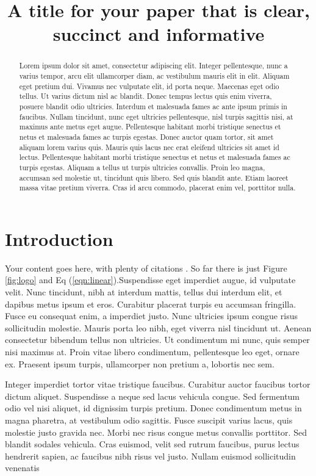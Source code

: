 \documentclass[OGEO,XML,SOM,NoBabelFrench,Unicode,twocolumn,review]{cedram}
\title{A title for your paper that is clear, succinct and informative}
\begin{document}
    \begin{abstract}
        Lorem ipsum dolor sit amet, consectetur adipiscing elit. Integer pellentesque, nunc a varius tempor, arcu elit ullamcorper diam, ac vestibulum mauris elit in elit. Aliquam eget pretium dui. Vivamus nec vulputate elit, id porta neque. Maecenas eget odio tellus. Ut varius dictum nisl ac blandit. Donec tempus lectus quis enim viverra, posuere blandit odio ultricies. Interdum et malesuada fames ac ante ipsum primis in faucibus. Nullam tincidunt, nunc eget ultricies pellentesque, nisl turpis sagittis nisi, at maximus ante metus eget augue. Pellentesque habitant morbi tristique senectus et netus et malesuada fames ac turpis egestas. Donec auctor quam tortor, sit amet aliquam lorem varius quis. Mauris quis lacus nec erat eleifend ultricies sit amet id lectus. Pellentesque habitant morbi tristique senectus et netus et malesuada fames ac turpis egestas. Aliquam a tellus ut turpis ultricies convallis. Proin leo magna, accumsan sed molestie ut, tincidunt quis libero. Sed quis blandit ante. Etiam laoreet massa vitae pretium viverra. Cras id arcu commodo, placerat enim vel, porttitor nulla.
    \end{abstract}
    
    \maketitle

    \section{Introduction}

        Your content goes here, with plenty of citations \citep{sample}. So far there is just Figure \ref{fig:logo} and Eq (\ref{eqn:linear}).Suspendisse eget imperdiet augue, id vulputate velit. Nunc tincidunt, nibh at interdum mattis, tellus dui interdum elit, et dapibus metus ipsum et eros. Curabitur placerat turpis eu accumsan fringilla. Fusce eu consequat enim, a imperdiet justo. Nunc ultricies ipsum congue risus sollicitudin molestie. Mauris porta leo nibh, eget viverra nisl tincidunt ut. Aenean consectetur bibendum tellus non ultricies. Ut condimentum mi nunc, quis semper nisi maximus at. Proin vitae libero condimentum, pellentesque leo eget, ornare ex. Praesent ipsum turpis, ullamcorper non pretium a, lobortis nec sem.

        Integer imperdiet tortor vitae tristique faucibus. Curabitur auctor faucibus tortor dictum aliquet. Suspendisse a neque sed lacus vehicula congue. Sed fermentum odio vel nisi aliquet, id dignissim turpis pretium. Donec condimentum metus in magna pharetra, at vestibulum odio sagittis. Fusce suscipit varius lacus, quis molestie justo gravida nec. Morbi nec risus congue metus convallis porttitor. Sed blandit sodales vehicula. Cras euismod, velit sed rutrum faucibus, purus lectus hendrerit sapien, ac faucibus nibh risus vel justo. Nullam euismod sollicitudin venenatis
        
\end{document}
